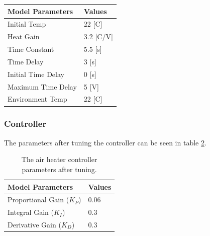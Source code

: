 \documentclass[11pt, A4paper, english]{article}
\numberwithin{equation}{section}
\begin{document}
\begin{multicols}{2}
\begin{table}[H]
		\noindent \begin{tabularx}{\columnwidth}{@{}l | l}
\hline
\textbf{Model Parameters}	\hspace{2cm}	& \textbf{Values}	\\
\hline
Initial Temp 								& 22 [C] 			\\
Heat Gain 									& 3.2 [C/V]			\\
Time Constant								& 5.5 [s]			\\
Time Delay									& 3 [s]	 			\\
Initial Time Delay						 	& 0	[s]				\\
Maximum Time Delay						 	& 5 [V]				\\
Environment Temp			 				& 22 [C]			\\
\hline
					\end{tabularx}
\label{tab:model parameters}
				\end{table}
			
			\subsubsection{Controller}
The parameters after tuning the controller can be seen in table \ref{tab:controller parameters}.
				\begin{table}[H]
\caption{The air heater controller parameters after tuning.}
		\noindent \begin{tabularx}{\columnwidth}{@{}l | l}
\hline
\textbf{Model Parameters}	\hspace{2cm}	& \textbf{Values}	\\
\hline
Proportional Gain ($K_P$)  					& 0.06 				\\
Integral Gain ($K_I$)						& 0.3				\\
Derivative Gain	($K_D$)						& 0.3				\\
\hline
					\end{tabularx}
\label{tab:controller parameters}
				\end{table}


\end{multicols}
\end{document}
